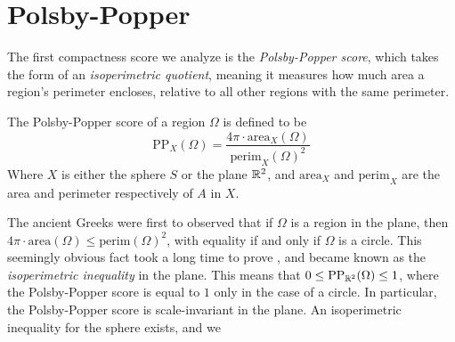 \section{Polsby-Popper}\label{sec:pp}

The first compactness score we analyze is the \textit{Polsby-Popper
score}, which takes the form of an \textit{isoperimetric quotient},
meaning it measures how much area a region's perimeter encloses,
relative to all other regions with the same perimeter.
\begin{definition}\label{def:pp}
  The Polsby-Popper score of a region $\Omega$ is defined to be
  $$\mathrm{PP}_X(\Omega) = \frac{4\pi
  \cdot\mathrm{area}_X(\Omega)}{\mathrm{perim}_X(\Omega)^2}$$ 
  Where $X$ is either the sphere $S$ or the plane $\mathbb{R}^2$, and
  $\mathrm{area}_X$ and $\mathrm{perim}_X$ are the area and perimeter
  respectively of $A$ in $X$.
\end{definition}
The ancient Greeks were first to observed that if $\Omega$ is a region
in the plane, then $4\pi\cdot\mathrm{area}(\Omega)\leq
\mathrm{perim}(\Omega)^2$, with equality if and only if $\Omega$ is
a circle. This seemingly obvious fact took a long time to prove%
, and became known as the \textit{isoperimetric inequality} in
the plane.  This means that $0\le \mathrm{PP}_{\mathbb{R}^2}(\Omega)\le 1$,
where the Polsby-Popper score is equal to $1$ only in the case of
a circle. In particular, the Polsby-Popper score is scale-invariant in
the plane. An isoperimetric inequality for the sphere exists, and we
